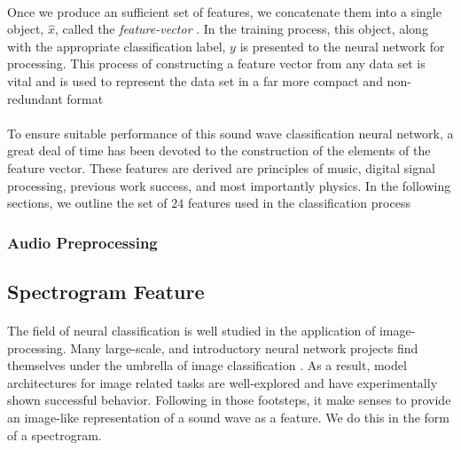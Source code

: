 \documentclass[12pt,letterpaper]{article}
\begin{document}
\paragraph*{}Once we produce an sufficient set of features, we concatenate them into a single object, $\hat{x}$, called the \textit{feature-vector} \cite{Goodfellow}. In the training process, this object, along with the appropriate classification label, $y$ is presented to the neural network for processing. This process of constructing a feature vector from any data set is vital and is used to represent the data set in a far more compact and non-redundant format \cite{Virtanen,Liu}

\paragraph*{}To ensure suitable performance of this sound wave classification neural network, a great deal of time has been devoted to the construction of the elements of the feature vector. These features are derived are principles of music, digital signal processing, previous work success, and most importantly physics. In the following sections, we outline the set of $24$ features used in the classification process

\subsubsection{Audio Preprocessing}


\subsection{Spectrogram Feature}
\label{subsec-spectrogram}

\paragraph*{}The field of neural classification is well studied in the application of image-processing. Many large-scale, and introductory neural network projects find themselves under the umbrella of image classification \cite{Geron,Goodfellow,Loy,Mierswa}. As a result, model architectures for image related tasks are well-explored and have experimentally shown successful behavior. Following in those footsteps, it make senses to provide an image-like representation of a sound wave as a feature. We do this in the form of a spectrogram.
\end{document}
